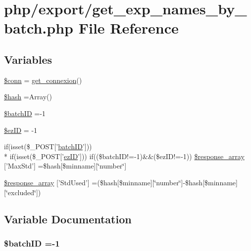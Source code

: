 \hypertarget{get__exp__names__by__batch_8php}{\section{php/export/get\-\_\-exp\-\_\-names\-\_\-by\-\_\-batch.php File Reference}
\label{get__exp__names__by__batch_8php}
}
\subsection*{Variables}
\begin{DoxyCompactItemize}
\item 
\hyperlink{get__exp__names__by__batch_8php_aa8a5a87b9c1a6a0819b88447cbe41877}{\$conn} = \hyperlink{php__functions_8php_ace18bc10f3fd08f92688ac743e0d8c2e}{get\-\_\-connexion}()
\item 
\hyperlink{get__exp__names__by__batch_8php_ac9fdf6f2c8fb45c1d3bb9a176802b2ad}{\$hash} =Array()
\item 
\hyperlink{get__exp__names__by__batch_8php_aaa6d122ea9cb55b210aadd86e5654a74}{\$batch\-I\-D} =-\/1
\item 
\hyperlink{get__exp__names__by__batch_8php_addb1ec3ba55e413a08cb006ce21974df}{\$ez\-I\-D} = -\/1
\item 
if(isset(\$\-\_\-\-P\-O\-S\-T\mbox{[}'\hyperlink{obsolete_2processing__bak_8php_a88c5bc4262b7c34f236357f5c53fc99b}{batch\-I\-D}'\mbox{]})) \\*
if(isset(\$\-\_\-\-P\-O\-S\-T\mbox{[}'\hyperlink{admin_rawdata_8php_adf465cadf95987152966d26567509f92}{ez\-I\-D}'\mbox{]})) if((\$batch\-I\-D!=-\/1)\&\&(\$ez\-I\-D!=-\/1)) \hyperlink{get__exp__names__by__batch_8php_a1fb972d1e2547fe562f66e66a72523f2}{\$response\-\_\-array} \mbox{[}'Max\-Std'\mbox{]} =\$hash\mbox{[}\$minname\mbox{]}\mbox{[}\char`\"{}number\char`\"{}\mbox{]}
\item 
\hyperlink{get__exp__names__by__batch_8php_af1aae1e270d9c73099bf08cba661e291}{\$response\-\_\-array} \mbox{[}'Std\-Used'\mbox{]} =(\$hash\mbox{[}\$minname\mbox{]}\mbox{[}\char`\"{}number\char`\"{}\mbox{]}-\/\$hash\mbox{[}\$minname\mbox{]}\mbox{[}\char`\"{}excluded\char`\"{}\mbox{]})
\end{DoxyCompactItemize}


\subsection{Variable Documentation}
\hypertarget{get__exp__names__by__batch_8php_aaa6d122ea9cb55b210aadd86e5654a74}{
\subsubsection[{\$batch\-I\-D}]{\setlength{\rightskip}{0pt plus 5cm}\${\bf batch\-I\-D} =-\/1}}\label{get__exp__names__by__batch_8php_aaa6d122ea9cb55b210aadd86e5654a74}


